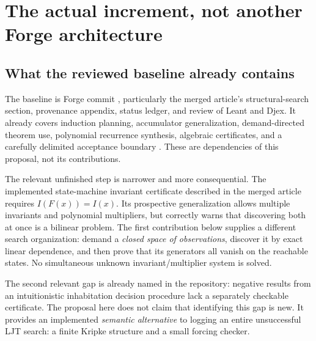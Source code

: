 \section{The actual increment, not another Forge architecture}
\label{sec:delta}

\subsection{What the reviewed baseline already contains}
The baseline is Forge commit
, particularly the merged article's
structural-search section, provenance appendix, status ledger, and review of
Leant and Djex. It already covers induction planning, accumulator
generalization, demand-directed theorem use, polynomial recurrence synthesis,
algebraic certificates, and a carefully delimited acceptance boundary
\cite{forge,forge-structural,forge-status,forge-neighbors}. These are dependencies
of this proposal, not its contributions.

The relevant unfinished step is narrower and more consequential. The implemented
state-machine invariant certificate described in the merged article requires
$I(F(x))=I(x)$. Its prospective generalization allows multiple invariants and
polynomial multipliers, but correctly warns that discovering both at once is a
bilinear problem. The first contribution below supplies a different search
organization: demand a \emph{closed space of observations}, discover it by exact
linear dependence, and then prove that its generators all vanish on the
reachable states. No simultaneous unknown invariant/multiplier system is solved.

The second relevant gap is already named in the repository: negative results
from an intuitionistic inhabitation decision procedure lack a separately
checkable certificate. The proposal here does not claim that identifying this
gap is new. It provides an implemented \emph{semantic alternative} to logging an
entire unsuccessful LJT search: a finite Kripke structure and a small forcing
checker.

